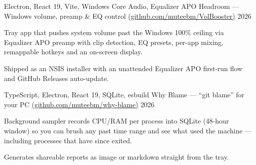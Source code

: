 
\begin{cventries}
  \cventry
    {Electron, React 19, Vite, Windows Core Audio, Equalizer APO} %
    {Headroom — Windows volume, preamp \& EQ control \href{https://github.com/muteebm/VolBooster}{(github.com/muteebm/VolBooster)}} %
    {} %
    {2026} %
    {
    \begin{cvitems}
      \item {Tray app that pushes system volume past the Windows 100\% ceiling via Equalizer APO preamp with clip detection, EQ presets, per-app mixing, remappable hotkeys and an on-screen display.}
      \item {Shipped as an NSIS installer with an unattended Equalizer APO first-run flow and GitHub Releases auto-update.}
    \end{cvitems}
    }

  \cventry
    {TypeScript, Electron, React 19, SQLite, esbuild} %
    {Why Blame — ``git blame'' for your PC \href{https://github.com/muteebm/why-blame}{(github.com/muteebm/why-blame)}} %
    {} %
    {2026} %
    {
    \begin{cvitems}
      \item {Background sampler records CPU/RAM per process into SQLite (48-hour window) so you can brush any past time range and see what used the machine — including processes that have since exited.}
      \item {Generates shareable reports as image or markdown straight from the tray.}
    \end{cvitems}
    }
\end{cventries}
